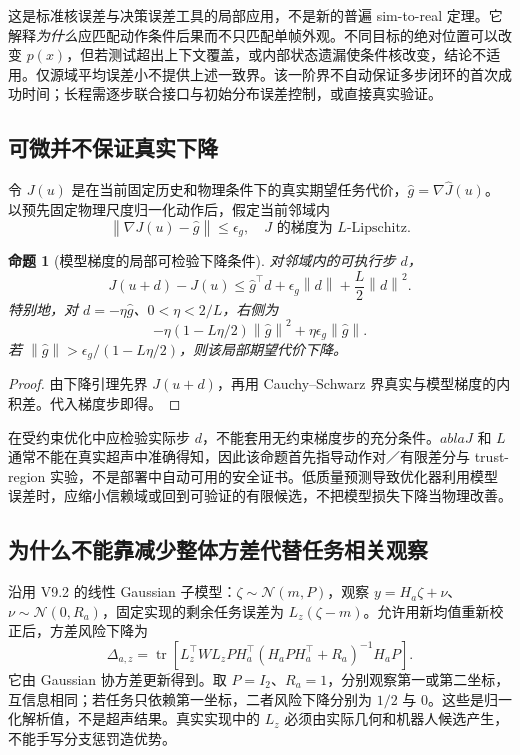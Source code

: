 \documentclass[UTF8,fontset=fandol,11pt,a4paper]{ctexart}
\theoremstyle{plain}
\newtheorem{proposition}[theorem]{命题}
\theoremstyle{definition}
\theoremstyle{remark}
\numberwithin{equation}{section}
\newcommand{\norm}[1]{\left\lVert#1\right\rVert}
\DeclareMathOperator{\tr}{tr}
\begin{document}
这是标准核误差与决策误差工具的局部应用，不是新的普遍 sim-to-real 定理。它解释\emph{为什么}应匹配动作条件后果而不只匹配单帧外观。不同目标的绝对位置可以改变 $p(x)$，但若测试超出上下文覆盖，或内部状态遗漏使条件核改变，结论不适用。仅源域平均误差小不提供上述一致界。该一阶界不自动保证多步闭环的首次成功时间；长程需逐步联合接口与初始分布误差控制，或直接真实验证。

\subsection{可微并不保证真实下降}
令 $J(u)$ 是在当前固定历史和物理条件下的真实期望任务代价，$\widehat g=\nabla\widehat J(u)$。以预先固定物理尺度归一化动作后，假定当前邻域内
\begin{equation}
\norm{\nabla J(u)-\widehat g}\le\epsilon_g,
\quad J\text{ 的梯度为 }L\text{-Lipschitz}.
\end{equation}
\begin{proposition}[模型梯度的局部可检验下降条件]
对邻域内的可执行步 $d$，
\begin{equation}
J(u+d)-J(u)\le
\widehat g^\top d+\epsilon_g\norm d+\frac L2\norm d^2.
\label{eq:descent}
\end{equation}
特别地，对 $d=-\eta\widehat g$、$0<\eta<2/L$，右侧为
\begin{equation}
-\eta(1-L\eta/2)\norm{\widehat g}^2+
\eta\epsilon_g\norm{\widehat g}.
\end{equation}
若 $\norm{\widehat g}>\epsilon_g/(1-L\eta/2)$，则该局部期望代价下降。
\end{proposition}
\begin{proof}由下降引理先界 $J(u+d)$，再用 Cauchy--Schwarz 界真实与模型梯度的内积差。代入梯度步即得。\end{proof}

在受约束优化中应检验实际步 $d$，不能套用无约束梯度步的充分条件。$
abla J$ 和 $L$ 通常不能在真实超声中准确得知，因此该命题首先指导动作对／有限差分与 trust-region 实验，不是部署中自动可用的安全证书。低质量预测导致优化器利用模型误差时，应缩小信赖域或回到可验证的有限候选，不把模型损失下降当物理改善。

\subsection{为什么不能靠减少整体方差代替任务相关观察}
沿用 V9.2 的线性 Gaussian 子模型：$\zeta\sim\mathcal N(m,P)$，观察 $y=H_a\zeta+\nu$、$\nu\sim\mathcal N(0,R_a)$，固定实现的剩余任务误差为 $L_z(\zeta-m)$。允许用新均值重新校正后，方差风险下降为
\begin{equation}
\Delta_{a,z}=\tr\!\left[L_z^\top WL_zPH_a^\top
(H_aPH_a^\top+R_a)^{-1}H_aP\right].
\label{eq:voi}
\end{equation}
它由 Gaussian 协方差更新得到。取 $P=I_2$、$R_a=1$，分别观察第一或第二坐标，互信息相同；若任务只依赖第一坐标，二者风险下降分别为 $1/2$ 与 $0$。这些是归一化解析值，不是超声结果。真实实现中的 $L_z$ 必须由实际几何和机器人候选产生，不能手写分支惩罚造优势。
\end{document}
